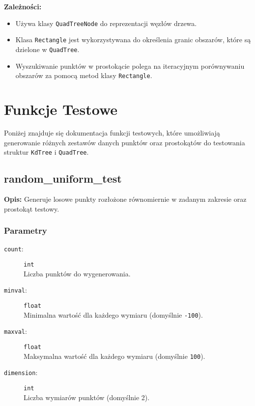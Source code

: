 \documentclass[12pt]{article}
\begin{document}
\textbf{Zależności:}
\begin{itemize}
    \item Używa klasy \texttt{QuadTreeNode} do reprezentacji węzłów drzewa.
    \item Klasa \texttt{Rectangle} jest wykorzystywana do określenia granic obszarów, które są dzielone w \texttt{QuadTree}.
    \item Wyszukiwanie punktów w prostokącie polega na iteracyjnym porównywaniu obszarów za pomocą metod klasy \texttt{Rectangle}.
\end{itemize}

\section{Funkcje Testowe}

Poniżej znajduje się dokumentacja funkcji testowych, które umożliwiają generowanie różnych zestawów danych punktów oraz prostokątów do testowania struktur \texttt{KdTree} i \texttt{QuadTree}.

\subsection{random\_uniform\_test}

\textbf{Opis:} Generuje losowe punkty rozłożone równomiernie w zadanym zakresie oraz prostokąt testowy.

\subsubsection{Parametry}

\begin{description}
    \item[\texttt{count}:] \texttt{int} \\
    Liczba punktów do wygenerowania.
    
    \item[\texttt{minval}:] \texttt{float} \\
    Minimalna wartość dla każdego wymiaru (domyślnie \texttt{-100}).
    
    \item[\texttt{maxval}:] \texttt{float} \\
    Maksymalna wartość dla każdego wymiaru (domyślnie \texttt{100}).
    
    \item[\texttt{dimension}:] \texttt{int} \\
    Liczba wymiarów punktów (domyślnie 2).
\end{description}
\end{document}
